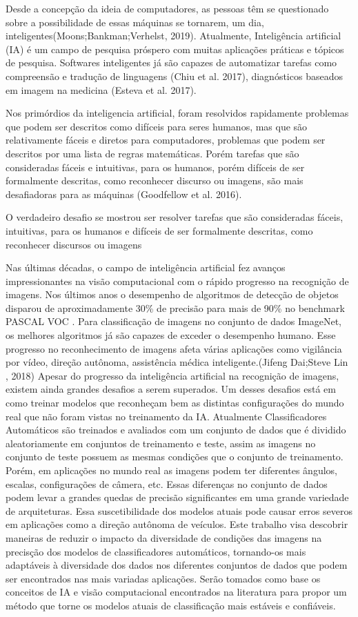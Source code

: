 	Desde a concepção da ideia de computadores, as pessoas têm se questionado sobre a possibilidade de essas máquinas se tornarem, um dia, inteligentes(Moons;Bankman;Verhelst, 2019). Atualmente, Inteligência artificial (IA) é um campo de pesquisa próspero com muitas aplicações práticas e tópicos de pesquisa.  Softwares inteligentes já são capazes de automatizar tarefas como compreensão e tradução de linguagens (Chiu et al. 2017), diagnósticos baseados em imagem na medicina (Esteva et al. 2017).
	
	Nos primórdios da inteligencia artificial, foram resolvidos rapidamente problemas que podem ser descritos como difíceis para seres humanos, mas que são relativamente fáceis e diretos para computadores, problemas que podem ser descritos por uma lista de regras matemáticas. Porém tarefas que são consideradas fáceis e intuitivas, para os humanos, porém difíceis de ser formalmente descritas, como reconhecer discurso ou imagens, são mais desafiadoras para as máquinas (Goodfellow et al. 2016).

O verdadeiro desafio se mostrou ser resolver tarefas que são consideradas fáceis, intuitivas, para os humanos e difíceis de ser formalmente descritas, como reconhecer discursos ou imagens 

	Nas últimas décadas, o campo de inteligência artificial fez avanços impressionantes na visão computacional com o rápido progresso na recognição de imagens.  Nos últimos anos o desempenho de algoritmos de detecção de objetos disparou de aproximadamente 30\% de precisão para mais de 90\% no benchmark PASCAL VOC . Para classificação de imagens no conjunto de dados ImageNet, os melhores algoritmos já são capazes de exceder o desempenho humano. Esse progresso no reconhecimento de imagens afeta várias aplicações como vigilância por vídeo, direção autônoma, assistência médica inteligente.(Jifeng Dai;Steve Lin ,  2018)
	Apesar do progresso da inteligência artificial na recognição de imagens, existem ainda grandes desafios a serem superados. Um desses desafios está em como treinar modelos que reconheçam bem as distintas configurações do mundo real que não foram vistas no treinamento da IA. Atualmente Classificadores Automáticos são treinados e avaliados com um conjunto de dados que é dividido aleatoriamente em conjuntos de treinamento e teste, assim as imagens no conjunto de teste possuem as mesmas condições  que o conjunto de treinamento. Porém, em aplicações no mundo real as imagens podem ter diferentes ângulos, escalas, configurações de câmera, etc. Essas diferenças no conjunto de dados podem levar a grandes quedas de precisão significantes em uma grande variedade de arquiteturas. Essa suscetibilidade dos modelos atuais pode causar erros severos em aplicações como a direção autônoma de veículos.
 	Este trabalho visa descobrir maneiras de reduzir o impacto da diversidade de condições das imagens na precisção dos modelos de classificadores automáticos, tornando-os mais adaptáveis à diversidade dos dados nos diferentes conjuntos de dados que podem ser encontrados nas mais variadas aplicações. Serão tomados como base os conceitos de IA e visão computacional encontrados na literatura para propor um método que torne os modelos atuais de classificação mais estáveis e confiáveis.
 	
